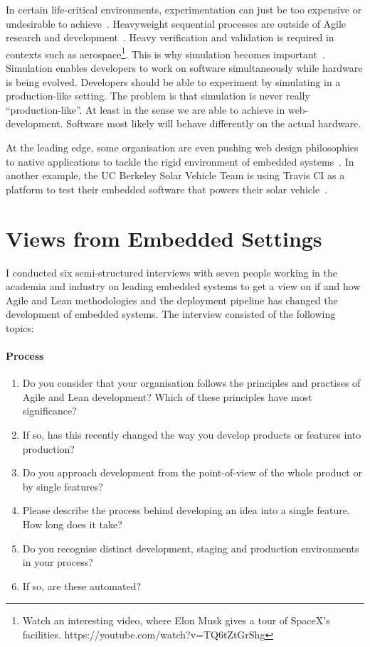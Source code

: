 \documentclass[english]{tktltiki2}
\begin{document}
In certain life-critical environments, experimentation can just be too expensive or undesirable to achieve~\cite{BE12}. Heavyweight sequential processes are outside of Agile research and development~\cite{EHS14}. Heavy verification and validation is required in contexts such as aerospace\footnote{Watch an interesting video, where Elon Musk gives a tour of SpaceX’s facilities. https://youtube.com/watch?v=TQ6tZtGrShg}. This is why simulation becomes important~\cite{KRM13}. Simulation enables developers to work on software simultaneously while hardware is being evolved. Developers should be able to experiment by simulating in a production-like setting. The problem is that simulation is never really “production-like”. At least in the sense we are able to achieve in web-development. Software most likely will behave differently on the actual hardware.

At the leading edge, some organisation are even pushing web design philosophies to native applications to tackle the rigid environment of embedded systems~\cite{Boh13, GZ14}. In another example, the UC Berkeley Solar Vehicle Team is using Travis CI as a platform to test their embedded software that powers their solar vehicle~\cite{Ngy15}.


\section{Views from Embedded Settings}

I conducted six semi-structured interviews with seven people working in the academia and industry on leading embedded systems to get a view on if and how Agile and Lean methodologies and the deployment pipeline has changed the development of embedded systems. The interview consisted of the following topics:

\paragraph{Process}

\begin{enumerate}

    \item Do you consider that your organisation follows the principles and practises of Agile and Lean development? Which of these principles have most significance?
    \item If so, has this recently changed the way you develop products or features into production?
    \item Do you approach development from the point-of-view of the whole product or by single features?
    \item Please describe the process behind developing an idea into a single feature. How long does it take?
    \item Do you recognise distinct development, staging and production environments in your process?
    \item If so, are these automated?

\end{enumerate}
\end{document}

